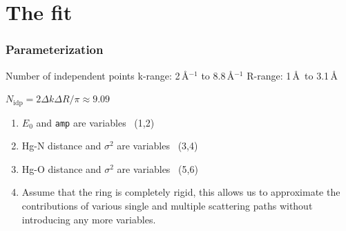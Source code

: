 \documentclass[10pt, xcolor=x11names, compress]{beamer}
\begin{document}
\section{The fit}

\begin{frame}
  \frametitle{Parameterization}

  \begin{center}
    \begin{minipage}{0.8\linewidth}
      \begin{block}{Number of independent points}
        k-range: 2\,\AA$^{-1}$ to 8.8\,\AA$^{-1}$ \hfill
        R-range: 1\,\AA\ to 3.1\,\AA \\[-2ex]
        \begin{center}
          $N_{\mathrm{idp}} = 2\Delta k\Delta R / \pi \approx 9.09$
        \end{center}
      \end{block}
    \end{minipage}

  \end{center}
  \begin{enumerate}
  \item $E_0$ and \texttt{amp} are variables \dotfill\ (1,2)
  \item Hg-N distance and $\sigma^2$ are variables \dotfill\ (3,4)
  \item Hg-O distance and $\sigma^2$ are variables \dotfill\ (5,6)
  \item Assume that the ring is \alert{completely rigid}, this allows
    us to approximate the contributions of various single and multiple
    scattering paths without introducing any more variables.
  \end{enumerate}



\end{frame}
\end{document}
